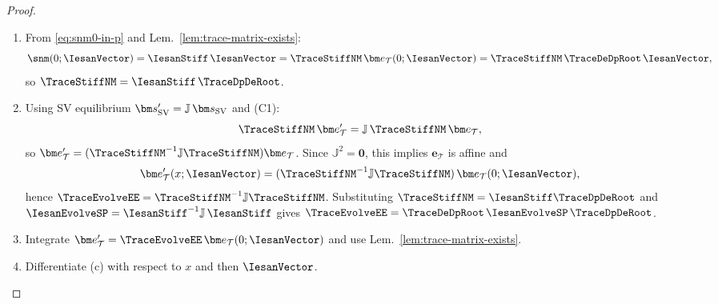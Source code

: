 \begin{proof}

\begin{enumerate}
\item[(a)] From \eqref{eq:snm0-in-p} and Lem.~\ref{lem:trace-matrix-exists}:
\[
  \snm(0;\IesanVector)=\IesanStiff\,\IesanVector
  =\TraceStiffNM\,\bm e_{\mathcal T}(0;\IesanVector)
  =\TraceStiffNM\,\TraceDeDpRoot\,\IesanVector,
\]
so $\TraceStiffNM=\IesanStiff\,\TraceDpDeRoot$.

\item[(b)] Using SV equilibrium $ \bm s_{\rm SV}'=\mathbb J\,\bm s_{\rm SV}$ and (C1):
\[
  \TraceStiffNM\,\bm e_{\mathcal T}'=\mathbb J\,\TraceStiffNM\,\bm e_{\mathcal T},
\]
so $\bm e_{\mathcal T}'=(\TraceStiffNM^{-1}\mathbb J\TraceStiffNM)\bm e_{\mathcal T}$.
Since $\mathbb J^2=\mathbf 0$, this implies $\bm e_{\mathcal T}$ is affine and
\[
  \bm e_{\mathcal T}'(x;\IesanVector)=(\TraceStiffNM^{-1}\mathbb J\TraceStiffNM)\,\bm e_{\mathcal T}(0;\IesanVector),
\]
hence $\TraceEvolveEE=\TraceStiffNM^{-1}\mathbb J\TraceStiffNM$.
Substituting $\TraceStiffNM=\IesanStiff\TraceDpDeRoot$ and
$\IesanEvolveSP=\IesanStiff^{-1}\mathbb J\,\IesanStiff$ gives
$\TraceEvolveEE=\TraceDeDpRoot\,\IesanEvolveSP\,\TraceDpDeRoot$.

\item[(c)] Integrate $\bm e_{\mathcal T}'=\TraceEvolveEE\,\bm e_{\mathcal T}(0;\IesanVector)$ and
use Lem.~\ref{lem:trace-matrix-exists}.

\item[(d)] Differentiate (c) with respect to $x$ and then $\IesanVector$.
\end{enumerate}
\end{proof}


